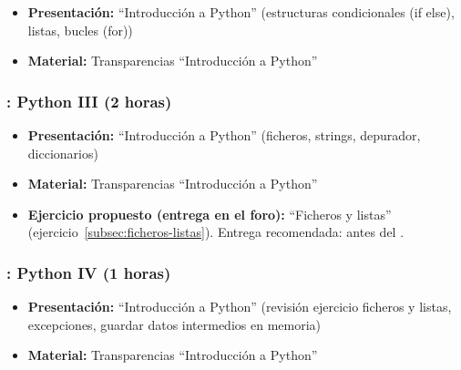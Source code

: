 \documentclass[a4paper,12pt]{article}
\begin{document}
\begin{itemize}
\item \textbf{Presentación:} ``Introducción a Python'' (estructuras condicionales (if else), listas, bucles (for))
\item \textbf{Material:} Transparencias ``Introducción a Python''
\end{itemize}

\subsubsection{\juevesC: Python III (2 horas)}
\label{cal:juevesC}

\begin{itemize}
\item \textbf{Presentación:} ``Introducción a Python'' (ficheros, strings, depurador, diccionarios)
\item \textbf{Material:} Transparencias ``Introducción a Python''

\item \textbf{Ejercicio propuesto (entrega en el foro):} ``Ficheros y listas'' (ejercicio~\ref{subsec:ficheros-listas}).
   Entrega recomendada: antes del \juevesD.


\end{itemize}



\subsubsection{\juevesD: Python IV (1 horas)}
\label{cal:juevesD}

\begin{itemize}
\item \textbf{Presentación:} ``Introducción a Python'' (revisión ejercicio ficheros y listas, excepciones, guardar datos intermedios en memoria)
\item \textbf{Material:} Transparencias ``Introducción a Python''

\end{itemize}
\end{document}

